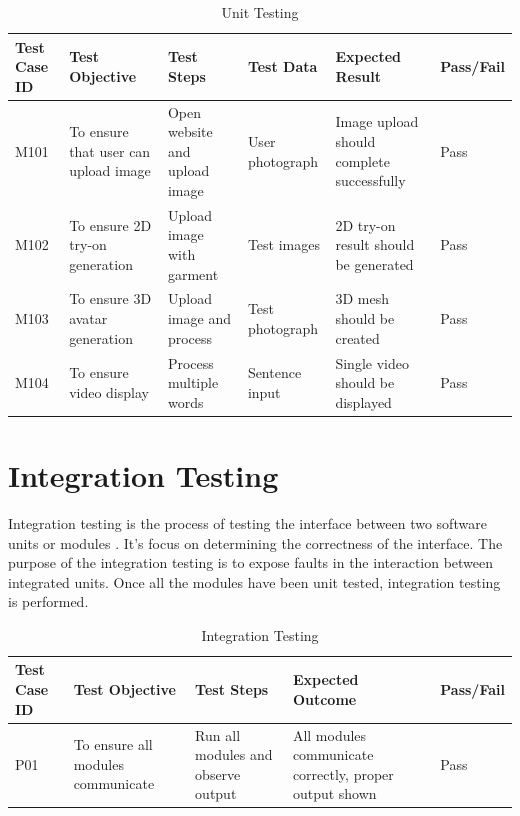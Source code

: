 \documentclass[12pt,a4paper,oneside]{report}
\begin{document}
\begin{table}[H]
\centering
\caption{Unit Testing}
\label{tab:unit-testing}
\begin{tabular}{|p{1.5cm}|p{1.5cm}|p{1.5cm}|p{1.5cm}|p{1.5cm}|p{1.5cm}|}
\hline
\textbf{Test Case ID} & \textbf{Test Objective} & \textbf{Test Steps} & \textbf{Test Data} & \textbf{Expected Result} & \textbf{Pass/Fail} \\
\hline
M101 & To ensure that user can upload image & Open website and upload image & User photograph & Image upload should complete successfully & Pass \\
\hline
M102 & To ensure 2D try-on generation & Upload image with garment & Test images & 2D try-on result should be generated \cite{16} & Pass \\
\hline
M103 & To ensure 3D avatar generation & Upload image and process & Test photograph & 3D mesh should be created \cite{1} & Pass \\
\hline
M104 & To ensure video display & Process multiple words & Sentence input & Single video should be displayed & Pass \\
\hline
\end{tabular}
\end{table}

\section{Integration Testing}

Integration testing is the process of testing the interface between two software units or modules \cite{19}. It's focus on determining the correctness of the interface. The purpose of the integration testing is to expose faults in the interaction between integrated units. Once all the modules have been unit tested, integration testing is performed.

\begin{table}[H]
\centering
\caption{Integration Testing}
\label{tab:integration-testing}
\begin{tabular}{|p{1.5cm}|p{3cm}|p{3cm}|p{2.5cm}|p{1.5cm}|}
\hline
\textbf{Test Case ID} & \textbf{Test Objective} & \textbf{Test Steps} & \textbf{Expected Outcome} & \textbf{Pass/Fail} \\
\hline
P01 & To ensure all modules communicate & Run all modules and observe output & All modules communicate correctly, proper output shown & Pass \\
\hline
\end{tabular}
\end{table}
\end{document}
